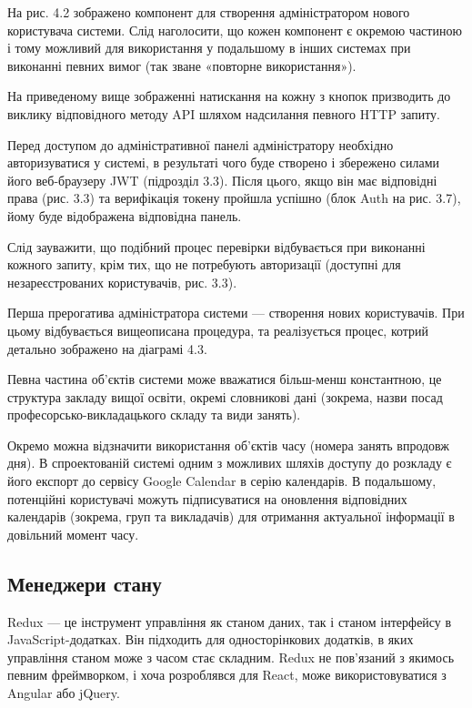 На рис. 4.2 зображено компонент для створення адміністратором нового користувача системи. Слід наголосити, що кожен компонент є окремою частиною і тому можливий для використання у подальшому в інших системах при виконанні певних вимог (так зване «повторне використання»).

На приведеному вище зображенні натискання на кожну з кнопок призводить до виклику відповідного методу API шляхом надсилання певного HTTP запиту.

Перед доступом до адміністративної панелі адміністратору необхідно авторизуватися у системі, в результаті чого буде створено і збережено силами його веб-браузеру JWT (підрозділ 3.3). Після цього, якщо він має відповідні права (рис. 3.3) та верифікація токену пройшла успішно (блок Auth на рис. 3.7), йому буде відображена відповідна панель.

Слід зауважити, що подібний процес перевірки відбувається при виконанні кожного запиту, крім тих, що не потребують авторизації (доступні для незареєстрованих користувачів, рис. 3.3).

Перша прерогатива адміністратора системи — створення нових користувачів. При цьому відбувається вищеописана процедура, та реалізується процес, котрий детально зображено на діаграмі 4.3.

Певна частина об’єктів системи може вважатися більш-менш константною, це структура закладу вищої освіти, окремі словникові дані (зокрема, назви посад професорсько-викладацького складу та види занять).

Окремо можна відзначити використання об’єктів часу (номера занять впродовж дня).  В спроектованій системі одним з можливих шляхів доступу до розкладу є його експорт до сервісу Google Calendar в серію календарів. В подальшому, потенційні користувачі можуть підписуватися на оновлення відповідних календарів (зокрема, груп та викладачів) для отримання актуальної інформації в довільний момент часу.

\subsection{Менеджери стану}

Redux — це інструмент управління як станом даних, так і станом інтерфейсу в JavaScript-додатках. Він підходить для односторінкових додатків, в яких управління станом може з часом стає складним. Redux не пов'язаний з якимось певним фреймворком, і хоча розроблявся для React, може використовуватися з Angular або jQuery.

